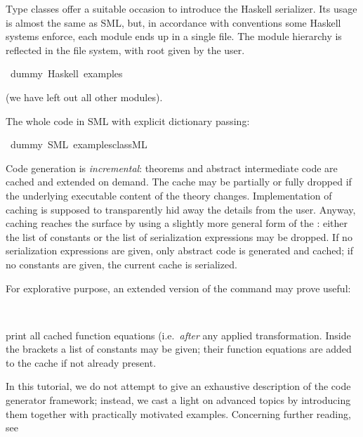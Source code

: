 \begin{isabellebody}
\begin{isamarkuptext}
Type classes offer a suitable occasion to introduce
  the Haskell serializer.  Its usage is almost the same
  as SML, but, in accordance with conventions
  some Haskell systems enforce, each module ends
  up in a single file. The module hierarchy is reflected in
  the file system, with root given by the user.%
\end{isamarkuptext}%
\isamarkuptrue%
\isamarkupfalse%
\ dummy\ {\isacharparenleft}Haskell\ {\isachardoublequoteopen}examples{\isacharslash}{\isachardoublequoteclose}{\isacharparenright}%
\begin{isamarkuptext}%

  (we have left out all other modules).

  The whole code in SML with explicit dictionary passing:%
\end{isamarkuptext}%
\isamarkuptrue%
\isamarkupfalse%
\ dummy\ {\isacharparenleft}SML\ {\isachardoublequoteopen}examples{\isacharslash}class{\isachardot}ML{\isachardoublequoteclose}{\isacharparenright}%
\begin{isamarkuptext}%
%
\end{isamarkuptext}%
\isamarkuptrue%
%
\isamarkuptrue%
%
\begin{isamarkuptext}%
Code generation is \emph{incremental}: theorems
  and abstract intermediate code are cached and extended on demand.
  The cache may be partially or fully dropped if the underlying
  executable content of the theory changes.
  Implementation of caching is supposed to transparently
  hid away the details from the user.  Anyway, caching
  reaches the surface by using a slightly more general form
  of the \isa{{\isasymCODEGEN}}: either the list of constants or the
  list of serialization expressions may be dropped.  If no
  serialization expressions are given, only abstract code
  is generated and cached; if no constants are given, the
  current cache is serialized.

  For explorative purpose, an extended version of the
  \isa{{\isasymCODEGEN}} command may prove useful:%
\end{isamarkuptext}%
\isamarkuptrue%
\isamarkupfalse%
\ {\isacharparenleft}{\isacharparenright}%
\begin{isamarkuptext}%
\noindent print all cached function equations (i.e.~\emph{after}
  any applied transformation. Inside the brackets a
  list of constants may be given; their function
  equations are added to the cache if not already present.%
\end{isamarkuptext}%
\isamarkuptrue%
%
\isamarkuptrue%
%
\begin{isamarkuptext}%
In this tutorial, we do not attempt to give an exhaustive
  description of the code generator framework; instead,
  we cast a light on advanced topics by introducing
  them together with practically motivated examples.  Concerning
  further reading, see


\end{isamarkuptext}
\end{isabellebody}
